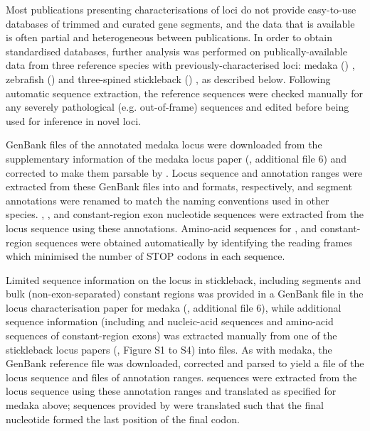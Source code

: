 Most publications presenting characterisations of \igh{} loci do not provide easy-to-use databases of trimmed and curated gene segments, and the data that is available is often partial and heterogeneous between publications. In order to obtain standardised databases, further analysis was performed on publically-available data from three reference species with previously-characterised \igh{} loci: medaka () \parencite{magadan2011medaka}, zebrafish () \parencite{danilova2005zebrafish} and three-spined stickleback () \parencite{bao2010stickleback,gambondeza2011stickleback}, as described below. Following automatic sequence extraction, the reference sequences were checked manually for any severely pathological (e.g. out-of-frame) sequences and edited before being used for inference in novel loci.


GenBank files of the annotated medaka \igh{} locus were downloaded from the supplementary information of the medaka locus paper (\parencite{magadan2011medaka}, additional file 6) and corrected to make them parsable by . Locus sequence and annotation ranges were extracted from these GenBank files into  and  formats, respectively, and segment annotations were renamed to match the naming conventions used in other species. \vh, \dh, \jh and constant-region exon nucleotide sequences were extracted from the locus sequence using these annotations. Amino-acid sequences for \vh, \jh and constant-region sequences were obtained automatically by identifying the reading frames which minimised the number of STOP codons in each sequence.


Limited sequence information on the \igh{} locus in stickleback, including \vh segments and bulk (non-exon-separated) constant regions was provided in a GenBank file in the locus characterisation paper for medaka (\parencite{magadan2011medaka}, additional file 6), while additional sequence information (including \dh and \jh nucleic-acid sequences and amino-acid sequences of constant-region exons) was extracted manually from one of the stickleback locus papers (\parencite{bao2010stickleback},  Figure S1 to S4) into  files. As with medaka, the GenBank reference file was downloaded, corrected and parsed to yield a  file of the locus sequence and  files of annotation ranges. \vh sequences were extracted from the locus sequence using these annotation ranges and translated as specified for medaka above; \jh sequences provided by \parencite{bao2010stickleback} were translated such that the final nucleotide formed the last position of the final codon.


